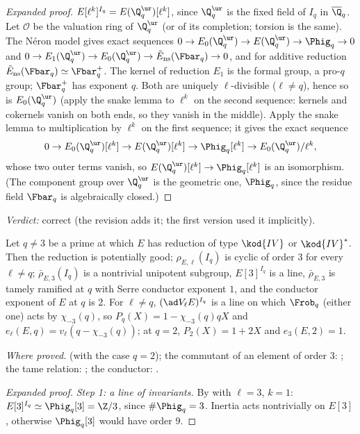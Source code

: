 \begin{sloppypar}
\begin{proof}[Expanded proof]
$E[\ell^k]^{I_q}=E(\Q_q^{\ur})[\ell^k]$, since $\Q_q^{\ur}$ is the fixed field of $I_q$ in $\overline\Q_q$. Let $\mathcal O$ be the valuation ring of $\Q_q^{\ur}$ (or of its completion; torsion is the same). The N\'eron model gives exact sequences
$0\to E_0(\Q_q^{\ur})\to E(\Q_q^{\ur})\to\Phig_q\to0$ and $0\to E_1(\Q_q^{\ur})\to E_0(\Q_q^{\ur})\to\tilde E_{\mathrm{ns}}(\Fbar_q)\to0$, and for additive reduction
$\tilde E_{\mathrm{ns}}(\Fbar_q)\simeq\Fbar_q^+$. The kernel of reduction $E_1$ is the formal group, a pro-$q$ group; $\Fbar_q^+$ has exponent $q$. Both are uniquely $\ell$-divisible ($\ell\ne q$),
hence so is $E_0(\Q_q^{\ur})$ (apply the snake lemma to $\ell^k$ on the second sequence: kernels and cokernels vanish on both ends, so they vanish in the middle). Apply the snake
lemma to multiplication by $\ell^k$ on the first sequence; it gives the exact sequence
\[
0\to E_0(\Q_q^{\ur})[\ell^k]\to E(\Q_q^{\ur})[\ell^k]\to\Phig_q[\ell^k]\to E_0(\Q_q^{\ur})/\ell^k,
\]
whose two outer terms vanish, so $E(\Q_q^{\ur})[\ell^k]\to\Phig_q[\ell^k]$ is an isomorphism. (The component group over $\Q_q^{\ur}$ is the geometric one, $\Phig_q$, since the residue field
$\Fbar_q$ is algebraically closed.)
\end{proof}

\noindent\emph{Verdict:} correct (the revision adds it; the first version used it implicitly).

\begin{lemma}\label{lem:paper:IV}
Let $q\ne3$ be a prime at which $E$ has reduction of type $\kod{IV}$ or $\kod{IV}^*$. Then the reduction is potentially good; $\rho_{E,\ell}(I_q)$ is cyclic of order $3$ for every
$\ell\ne q$; $\bar\rho_{E,3}(I_q)$ is a nontrivial unipotent subgroup, $E[3]^{I_q}$ is a line, $\bar\rho_{E,3}$ is tamely ramified at $q$ with Serre conductor exponent $1$, and
the conductor exponent of $E$ at $q$ is $2$. For $\ell\ne q$, $(\ad V_\ell E)^{I_q}$ is a line on which $\Frob_q$ (either one) acts by $\chi_{-3}(q)$, so $P_q(X)=1-\chi_{-3}(q)qX$ and
$e_\ell(E,q)=v_\ell(q-\chi_{-3}(q))$; at $q=2$, $P_2(X)=1+2X$ and $e_3(E,2)=1$.
\end{lemma}

\noindent\emph{Where proved.}  (with the case $q=2$); the commutant of an element of order $3$: ; the tame relation: ; the
conductor: .

\begin{proof}[Expanded proof]
\emph{Step 1: a line of invariants.} By  with $\ell=3$, $k=1$: $E[3]^{I_q}\simeq\Phig_q[3]=\Z/3$, since $\#\Phig_q=3$. Inertia acts nontrivially on $E[3]$,
otherwise $\Phig_q[3]$ would have order $9$.


\end{proof}
\end{sloppypar}
